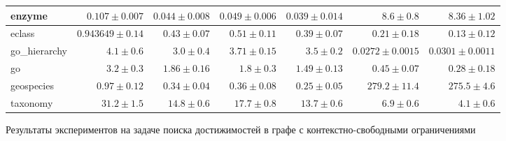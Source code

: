 \begin{frame}
\begin{figure}[H]
\begin{table}[]
{\begin{tabular}{|l|rrrrrr|}
enzyme &
  \multicolumn{1}{r|}{$0.107 \pm 0.007$} &
  \multicolumn{1}{r|}{$0.044 \pm 0.008$} &
  \multicolumn{1}{r|}{$0.049 \pm 0.006$} &
  \multicolumn{1}{r|}{$0.039 \pm 0.014$} &
  \multicolumn{1}{r|}{$8.6 \pm 0.8$} &
  $8.36 \pm 1.02$ \\ \hline
eclass &
  \multicolumn{1}{r|}{$0.943649 \pm 0.14$} &
  \multicolumn{1}{r|}{$0.43 \pm 0.07$} &
  \multicolumn{1}{r|}{$0.51 \pm 0.11$} &
  \multicolumn{1}{r|}{$0.39 \pm 0.07$} &
  \multicolumn{1}{r|}{$0.21 \pm 0.18$} &
  $0.13 \pm 0.12$ \\ \hline
go\_hierarchy &
  \multicolumn{1}{r|}{$4.1 \pm 0.6$} &
  \multicolumn{1}{r|}{$3.0 \pm 0.4$} &
  \multicolumn{1}{r|}{$3.71 \pm 0.15$} &
  \multicolumn{1}{r|}{$3.5 \pm 0.2$} &
  \multicolumn{1}{r|}{$0.0272 \pm 0.0015$} &
  $0.0301 \pm 0.0011$ \\ \hline
go &
  \multicolumn{1}{r|}{$3.2 \pm 0.3$} &
  \multicolumn{1}{r|}{$1.86 \pm 0.16$} &
  \multicolumn{1}{r|}{$1.8 \pm 0.3$} &
  \multicolumn{1}{r|}{$1.49 \pm 0.13$} &
  \multicolumn{1}{r|}{$0.45 \pm 0.07$} &
  $0.28 \pm 0.18$ \\ \hline
geospecies &
  \multicolumn{1}{r|}{$0.97 \pm 0.12$} &
  \multicolumn{1}{r|}{$0.34 \pm 0.04$} &
  \multicolumn{1}{r|}{$0.36 \pm 0.08$} &
  \multicolumn{1}{r|}{$0.25 \pm 0.05$} &
  \multicolumn{1}{r|}{$279.2 \pm 11.4$} &
  $275.5 \pm 4.6$ \\ \hline
taxonomy &
  \multicolumn{1}{r|}{$31.2 \pm 1.5$} &
  \multicolumn{1}{r|}{$14.8 \pm 0.6$} &
  \multicolumn{1}{r|}{$17.7 \pm 0.8$} &
  \multicolumn{1}{r|}{$13.7 \pm 0.6$} &
  \multicolumn{1}{r|}{$6.9 \pm 0.6$} &
  $4.1 \pm 0.6$ \\ \hline
\end{tabular}%
}
\end{table}
    \caption{Результаты экспериментов на задаче поиска достижимостей в графе с контекстно-свободными ограничениями}
\end{figure}
\end{frame}

